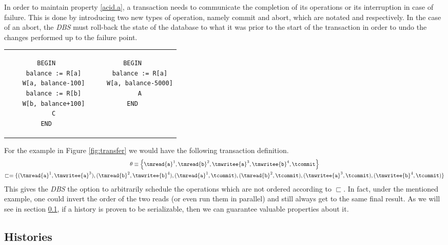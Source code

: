 In order to maintain property \ref{acid.a}, a transaction needs to communicate the completion of its operations or its interruption in case of failure. This is done by introducing two new types of operation, namely commit and abort, which are notated \tcommit and \tabort respectively. In the case of an abort, the \textit{DBS} must roll-back the state of the database to what it was prior to the start of the transaction in order to undo the changes performed up to the failure point.

\begin{center}
\begin{tabular}{c@{\hskip 0.5in}c}
\begin{lstlisting}
BEGIN
	balance := R[a]
	W[a, balance-100]
	balance := R[b]
	W[b, balance+100]
	C
END
\end{lstlisting}
&
\begin{lstlisting}
BEGIN
	balance := R[a]
	W[a, balance-5000]
	A
END
\end{lstlisting}
\end{tabular}
\label{fig:transfer}
\end{center}

For the example in Figure \ref{fig:transfer} we would have the following transaction definition.
\begin{gather*}
\theta \equiv \left\lbrace \tmread{\texttt{a}}^1, \tmread{\texttt{b}}^2, \tmwritee{\texttt{a}}^3, \tmwritee{\texttt{b}}^4, \tcommit \right\rbrace
\\
\sqsubset \equiv \{ (\tmread{\texttt{a}}^1, \tmwritee{\texttt{a}}^3), (\tmread{\texttt{b}}^2, \tmwritee{\texttt{b}}^4), (\tmread{\texttt{a}}^1, \tcommit), (\tmread{\texttt{b}}^2, \tcommit), (\tmwritee{\texttt{a}}^3, \tcommit), (\tmwritee{\texttt{b}}^4, \tcommit) \}
\end{gather*}
This gives the \textit{DBS} the option to arbitrarily schedule the operations which are not ordered according to $\sqsubset$. In fact, under the mentioned example, one could invert the order of the two reads (or even run them in parallel) and still always get to the same final result. As we will see in section \ref{histories}, if a history is proven to be serializable, then we can guarantee valuable properties about it.

\subsection{Histories} \label{histories}


